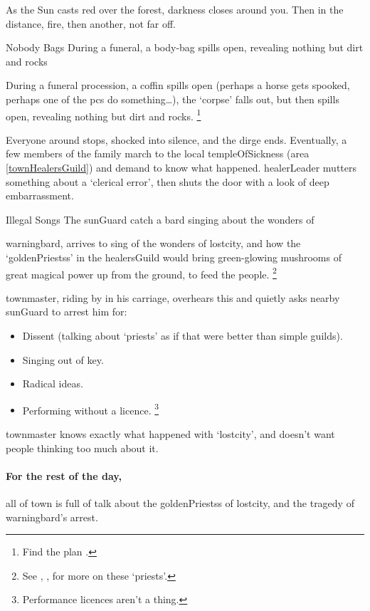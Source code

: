 \begin{boxtext}
  As the Sun casts red over the forest, darkness closes around you.
  Then in the distance, fire, then another, not far off.
\end{boxtext}

  {Nobody Bags}%
  {During a funeral, a body-bag spills open, revealing nothing but dirt and rocks}%

During a funeral procession, a coffin spills open (perhaps a horse gets spooked, perhaps one of the \glspl{pc} do something\ldots), the `corpse' falls out, but then spills open, revealing nothing but dirt and rocks.%
\footnote{Find the plan .}

Everyone around stops, shocked into silence, and the dirge ends.
Eventually, a few members of the family march to the local \gls{templeOfSickness} (area \vref{townHealersGuild}) and demand to know what happened.
\Gls{healerLeader} mutters something about a `clerical error', then shuts the door with a look of deep embarrassment.

{Illegal Songs}%
{The \gls{sunGuard} catch a bard singing about the wonders of }%

\Gls{warningbard}, arrives to sing of the wonders of \gls{lostcity}, and how the `\glspl{goldenPriests}' in the \gls{healersGuild} would bring green-glowing mushrooms of great magical power up from the ground, to feed the people.%
\footnote{See , , for more on these `priests'.}

\Gls{townmaster}, riding by in his carriage, overhears this and quietly asks nearby \gls{sunGuard} to arrest him for:

\begin{itemize}
  \item
  Dissent (talking about `priests' as if that were better than simple guilds).
  \item
  Singing out of key.
  \item
  Radical ideas.
  \item
  Performing without a licence.%
  \footnote{Performance licences aren't a thing.}
\end{itemize}

\Gls{townmaster} knows exactly what happened with `\gls{lostcity}', and doesn't want people thinking too much about it.

\paragraph{For the rest of the day,}
all of \gls{town} is full of talk about the \glspl{goldenPriests} of \gls{lostcity}, and the tragedy of \gls{warningbard}'s arrest.

